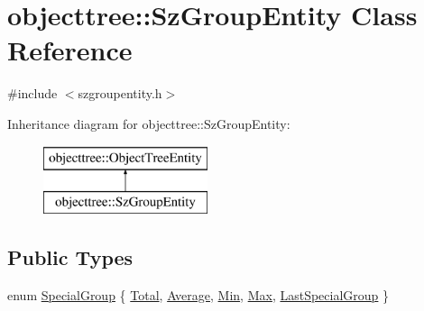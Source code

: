 \hypertarget{classobjecttree_1_1_sz_group_entity}{}\section{objecttree\+::Sz\+Group\+Entity Class Reference}
\label{classobjecttree_1_1_sz_group_entity}


{\ttfamily \#include $<$szgroupentity.\+h$>$}

Inheritance diagram for objecttree\+::Sz\+Group\+Entity\+:\begin{figure}[H]
\begin{center}
\leavevmode
\includegraphics[height=2.000000cm]{d3/d5f/classobjecttree_1_1_sz_group_entity}
\end{center}
\end{figure}
\subsection*{Public Types}
\begin{DoxyCompactItemize}
\item 
enum \mbox{\hyperlink{classobjecttree_1_1_sz_group_entity_a90828031e49c36d5b4abded9a6dfb242}{Special\+Group}} \{ \newline
\mbox{\hyperlink{classobjecttree_1_1_sz_group_entity_a90828031e49c36d5b4abded9a6dfb242ac56fb180465890d84512b18a955623c6}{Total}}, 
\mbox{\hyperlink{classobjecttree_1_1_sz_group_entity_a90828031e49c36d5b4abded9a6dfb242a0e801c7a1afe29727e47c64c5f52382f}{Average}}, 
\mbox{\hyperlink{classobjecttree_1_1_sz_group_entity_a90828031e49c36d5b4abded9a6dfb242a75062ca7f8aa365e51aaf1e3e9d7b501}{Min}}, 
\mbox{\hyperlink{classobjecttree_1_1_sz_group_entity_a90828031e49c36d5b4abded9a6dfb242a469f9cf749bacf02505f7f8604969a9d}{Max}}, 
\newline
\mbox{\hyperlink{classobjecttree_1_1_sz_group_entity_a90828031e49c36d5b4abded9a6dfb242a25557607313219c0b84cc62e9d47ba7a}{Last\+Special\+Group}}
 \}
\end{DoxyCompactItemize}

